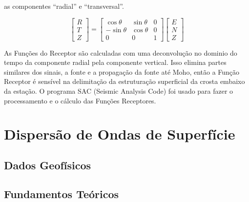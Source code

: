 as componentes “radial” e “transversal”. 

\[
\left[ \begin{array}{c} R \\ T \\ Z \end{array} \right] = \begin{bmatrix} \cos \theta & \sin \theta & 0 \\ - \sin \theta & \cos \theta & 0 \\ 0 & 0 & 1 \end{bmatrix} \left[ \begin{array}{c} E \\ N \\ Z \end{array} \right]
\]

As Funções do Receptor são calculadas com uma deconvolução no dominio do tempo da componente radial pela componente vertical. Isso elimina partes similares dos sinais, a fonte e a propagação da fonte até Moho, então a Função Receptor é sensível na delimitação da estruturação superficial da crosta embaixo da estação. O programa SAC (Seismic Analysis Code) foi usado para fazer o processamento e o cálculo das Funções Receptores. 

%
%
%


\section*{Dispersão de Ondas de Superfície}
\subsection*{Dados Geofísicos}
\subsection*{Fundamentos Teóricos}